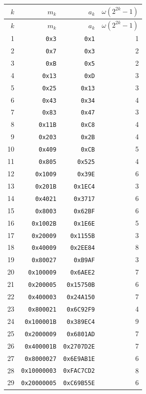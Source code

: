 \documentclass[11pt]{article}
\begin{document}
\begin{longtable}{rrrr}
\toprule
\(k\) & \(m_k\) & \(a_k\) & \(\omega(2^{2k}-1)\)\\
\midrule
\endfirsthead
\toprule
\(k\) & \(m_k\) & \(a_k\) & \(\omega(2^{2k}-1)\)\\
\midrule
\endhead
1 & \texttt{0x3} & \texttt{0x1} & 1 \\
2 & \texttt{0x7} & \texttt{0x3} & 2 \\
3 & \texttt{0xB} & \texttt{0x5} & 2 \\
4 & \texttt{0x13} & \texttt{0xD} & 3 \\
5 & \texttt{0x25} & \texttt{0x13} & 3 \\
6 & \texttt{0x43} & \texttt{0x34} & 4 \\
7 & \texttt{0x83} & \texttt{0x47} & 3 \\
8 & \texttt{0x11B} & \texttt{0xC8} & 4 \\
9 & \texttt{0x203} & \texttt{0x2B} & 4 \\
10 & \texttt{0x409} & \texttt{0xCB} & 5 \\
11 & \texttt{0x805} & \texttt{0x525} & 4 \\
12 & \texttt{0x1009} & \texttt{0x39E} & 6 \\
13 & \texttt{0x201B} & \texttt{0x1EC4} & 3 \\
14 & \texttt{0x4021} & \texttt{0x3717} & 6 \\
15 & \texttt{0x8003} & \texttt{0x62BF} & 6 \\
16 & \texttt{0x1002B} & \texttt{0x1E6E} & 5 \\
17 & \texttt{0x20009} & \texttt{0x1155B} & 3 \\
18 & \texttt{0x40009} & \texttt{0x2EE84} & 8 \\
19 & \texttt{0x80027} & \texttt{0xB9AF} & 3 \\
20 & \texttt{0x100009} & \texttt{0x6AEE2} & 7 \\
21 & \texttt{0x200005} & \texttt{0x15750B} & 6 \\
22 & \texttt{0x400003} & \texttt{0x24A150} & 7 \\
23 & \texttt{0x800021} & \texttt{0x6C92F9} & 4 \\
24 & \texttt{0x100001B} & \texttt{0x389EC4} & 9 \\
25 & \texttt{0x2000009} & \texttt{0x6801AD} & 7 \\
26 & \texttt{0x400001B} & \texttt{0x2707D2E} & 7 \\
27 & \texttt{0x8000027} & \texttt{0x6E9AB1E} & 6 \\
28 & \texttt{0x10000003} & \texttt{0xFAC7CD2} & 8 \\
29 & \texttt{0x20000005} & \texttt{0xC69B55E} & 6 \\
\bottomrule
\end{longtable}
\end{document}

